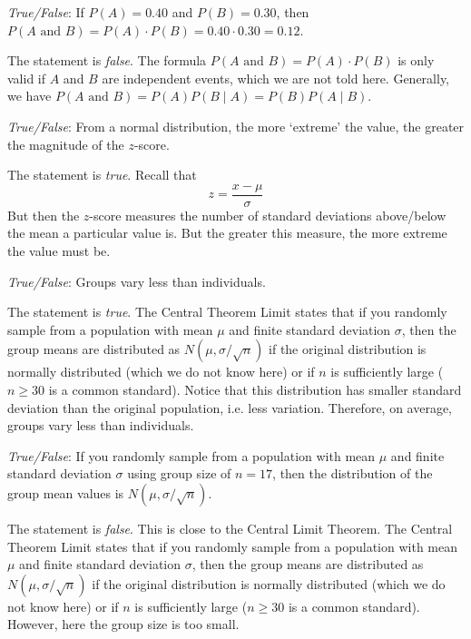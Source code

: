\documentclass[11pt,letterpaper]{article}
\begin{document}
\quizsol \textit{True/False}: If $P(A)= 0.40$ and $P(B)= 0.30$, then $P(A \text{ and }B)= P(A) \cdot P(B)= 0.40 \cdot 0.30= 0.12$. \pspace

\sol The statement is \textit{false}. The formula $P(A \text{ and }B)= P(A) \cdot P(B)$ is only valid if $A$ and $B$ are independent events, which we are not told here. Generally, we have $P(A \text{ and }B)= P(A) P(B \;|\;A)= P(B) P(A \;|\; B)$. \pvspace{1.5cm}



\quizsol \textit{True/False}: From a normal distribution, the more `extreme' the value, the greater the magnitude of the $z$-score. \pspace

\sol The statement is \textit{true}. Recall that
	\[
	z= \dfrac{x - \mu}{\sigma}
	\]
But then the $z$-score measures the number of standard deviations above/below the mean a particular value is. But the greater this measure, the more extreme the value must be. 



\newpage



\quizsol \textit{True/False}: Groups vary less than individuals. \pspace

\sol The statement is \textit{true}. The Central Theorem Limit states that if you randomly sample from a population with mean $\mu$ and finite standard deviation $\sigma$, then the group means are distributed as $N(\mu, \sigma/\sqrt{n})$ if the original distribution is normally distributed (which we do not know here) or if $n$ is sufficiently large ($n \geq 30$ is a common standard). Notice that this distribution has smaller standard deviation than the original population, i.e. less variation. Therefore, on average, groups vary less than individuals. \pvspace{1cm}



\quizsol \textit{True/False}: If you randomly sample from a population with mean $\mu$ and finite standard deviation $\sigma$ using group size of $n= 17$, then the distribution of the group mean values is $N(\mu, \sigma/\sqrt{n})$. \pspace

\sol The statement is \textit{false}. This is close to the Central Limit Theorem. The Central Theorem Limit states that if you randomly sample from a population with mean $\mu$ and finite standard deviation $\sigma$, then the group means are distributed as $N(\mu, \sigma/\sqrt{n})$ if the original distribution is normally distributed (which we do not know here) or if $n$ is sufficiently large ($n \geq 30$ is a common standard). However, here the group size is too small. 
\end{document}

